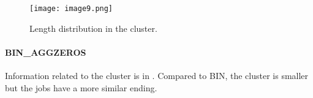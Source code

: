 \documentclass{jhps}
\makeatletter
\newcommand{\jk}[1]{\todo[inline]{JK:\@#1}}
\newcommand{\eb}[1]{\todo[inline, color=GreenYellow]{EB:\@#1}}
\makeatother
\begin{document}
\begin{minipage}{\textwidth}
\medskip

\begingroup
  \begin{subfigure}{\textwidth}
  \centering
  \texttt{[image: image9.png]}
  \caption{Length distribution in the cluster.}
  \label{fig:use_case:bin_all:length}
  \end{subfigure}
\endgroup

\label{fig:use_case:bin}
\end{minipage}


\paragraph{BIN\_AGGZEROS}
Information related to the cluster is in .
Compared to BIN, the cluster is smaller but the jobs have a more similar ending.

\end{document}
